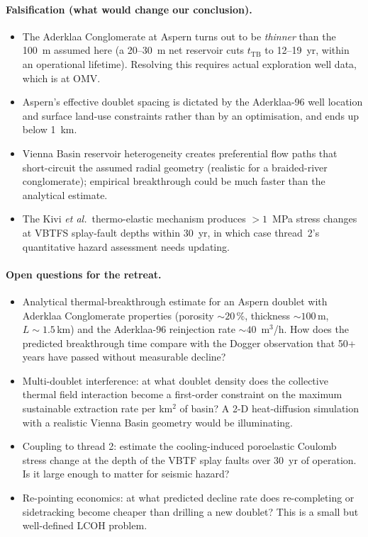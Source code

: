 \documentclass{article}
\begin{document}
\paragraph{Falsification (what would change our conclusion).}
\begin{itemize}
\item The Aderklaa Conglomerate at Aspern turns out to be
\emph{thinner} than the 100~m assumed here (a 20--30~m net
reservoir cuts $t_{\mathrm{TB}}$ to 12--19~yr, within an
operational lifetime). Resolving this requires actual exploration
well data, which is at OMV.
\item Aspern's effective doublet spacing is dictated by the
Aderklaa-96 well location and surface land-use constraints
rather than by an optimisation, and ends up below 1~km.
\item Vienna Basin reservoir heterogeneity creates preferential
flow paths that short-circuit the assumed radial geometry
(realistic for a braided-river conglomerate); empirical breakthrough
could be much faster than the analytical estimate.
\item The Kivi \emph{et al.}\ thermo-elastic mechanism produces
$> 1$~MPa stress changes at VBTFS splay-fault depths within
30~yr, in which case thread~2's quantitative hazard assessment
needs updating.
\end{itemize}

\paragraph{Open questions for the retreat.}
\begin{itemize}
\item Analytical thermal-breakthrough estimate for an Aspern doublet with
Aderklaa Conglomerate properties (porosity $\sim 20$\,\%, thickness
$\sim 100$\,m, $L \sim 1.5$\,km) and the Aderklaa-96 reinjection rate
$\sim 40$~m$^3$/h. How does the predicted breakthrough time compare with
the Dogger observation that 50+ years have passed without measurable
decline?
\item Multi-doublet interference: at what doublet density does the
collective thermal field interaction become a first-order constraint on
the maximum sustainable extraction rate per km$^2$ of basin? A 2-D
heat-diffusion simulation with a realistic Vienna Basin geometry would
be illuminating.
\item Coupling to thread 2: estimate the cooling-induced
poroelastic Coulomb stress change at the depth of the VBTF splay faults
over 30~yr of operation. Is it large enough to matter for seismic hazard?
\item Re-pointing economics: at what predicted decline rate does
re-completing or sidetracking become cheaper than drilling a new doublet?
This is a small but well-defined LCOH problem.
\end{itemize}
\end{document}
